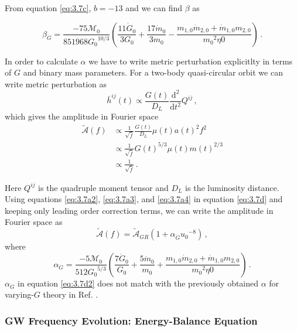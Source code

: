 \documentclass[11pt]{article}
\begin{document}
\hspace*{15.5pt}From equation \eqref{eq:3.7c}, $b=-13$  and we can find $\beta$ as

 \begin{equation}
 \beta_{\dot{G}}=\frac{-75 \mathcal{M}_0}{851968 {G_0}^{10/3}} \left(\frac{11 \dot{G}_0}{3 G_0} + \frac{17 \dot{m}_0}{3m_0}-\frac{m_{1,0}\dot{m}_{2,0}+\dot{m}_{1,0}m_{2,0}}{{m_0}^2 \eta0}\right)\,.
  \end{equation}
 
 \hspace*{15.5pt}In order to calculate $\alpha$ we have to write metric perturbation explicitlty in terms of $G$ and binary mass parameters. For a two-body quasi-circular orbit we can write metric perturbation as \cite{Blanchet:2002av}
 \begin{equation}
\bar{h}^{ij}(t)\propto \frac{G(t)}{D_L}\frac{\mathrm{d^2} }{\mathrm{d} t^2}Q^{ij}\,,
 \end{equation}
which gives the amplitude in Fourier space
\begin{align}\label{eq:3.7d}
\tilde{\mathcal{A}}(f)&\propto\frac{1}{\sqrt{\dot{f}}}\frac{G(t)}{D_L}\mu(t) a(t)^2f^2\nonumber\\&\propto\frac{1}{\sqrt{\dot{f}}}{G(t)}^{5/3}\mu(t){m(t)}^{2/3}\nonumber\\ &\propto \frac{1}{\sqrt{\dot{f}}}  \,.
\end{align} 
 

Here $Q^{ij}$ is the quadruple moment tensor and $D_L$ is the luminosity distance. Using equations \eqref{eq:3.7a2}, \eqref{eq:3.7a3}, and \eqref{eq:3.7a4} in equation \eqref{eq:3.7d} and keeping only leading order correction terms, we can write the amplitude in Fourier space as
\begin{equation}
\tilde{\mathcal{A}}(f)=\tilde{\mathcal{A}}_{GR}\left(1+\alpha_{\dot{G}}{u_0}^{-8}\right)\,,
\end{equation}
where
\begin{equation}\label{eq:3.7d2}
 \alpha_{\dot{G}}=\frac{-5\mathcal{M}_0}{512 {G_0}^{5/3}} \left(\frac{7 \dot{G}_0}{ G_0} + \frac{5\dot{m}_0}{m_0}+\frac{m_{1,0}\dot{m}_{2,0}+\dot{m}_{1,0}m_{2,0}}{{m_0}^2 \eta0}\right)\,.
 \end{equation}
 \hspace{15.5pt} $\alpha_{\dot{G}}$ in equation \eqref{eq:3.7d2} does not match with the previously obtained $\alpha$ for varying-$G$ theory in Ref. \cite{Yunes:2009bv}.
 
 \subsubsection*{GW Frequency Evolution: Energy-Balance Equation}
 
\end{document}
